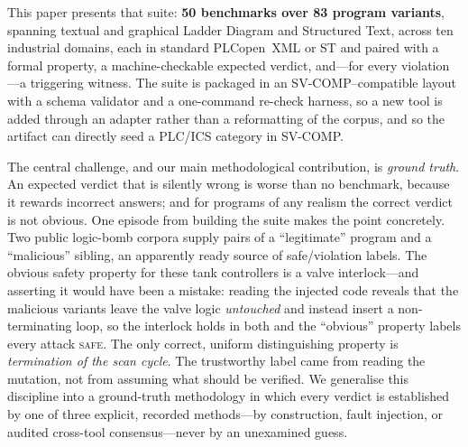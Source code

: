 This paper presents that suite: \textbf{50 benchmarks over 83 program variants}, spanning
textual and graphical Ladder Diagram and Structured Text, across ten industrial domains,
each in standard PLCopen~XML or ST and paired with a formal property, a machine-checkable
expected verdict, and---for every violation---a triggering witness. The suite is packaged in
an SV-COMP--compatible layout with a schema validator and a one-command re-check harness, so
a new tool is added through an adapter rather than a reformatting of the corpus, and so the
artifact can directly seed a PLC/ICS category in SV-COMP.

The central challenge, and our main methodological contribution, is \emph{ground truth}. An
expected verdict that is silently wrong is worse than no benchmark, because it rewards
incorrect answers; and for programs of any realism the correct verdict is not obvious. One
episode from building the suite makes the point concretely. Two public logic-bomb corpora
supply pairs of a ``legitimate'' program and a ``malicious'' sibling, an apparently ready
source of safe/violation labels. The obvious safety property for these tank controllers is a
valve interlock---and asserting it would have been a mistake: reading the injected code
reveals that the malicious variants leave the valve logic \emph{untouched} and instead insert
a non-terminating loop, so the interlock holds in both and the ``obvious'' property labels
every attack \textsc{safe}. The only correct, uniform distinguishing property is
\emph{termination of the scan cycle}. The trustworthy label came from reading the mutation,
not from assuming what should be verified. We generalise this discipline into a ground-truth
methodology in which every verdict is established by one of three explicit, recorded
methods---by construction, fault injection, or audited cross-tool consensus---never by an
unexamined guess.

